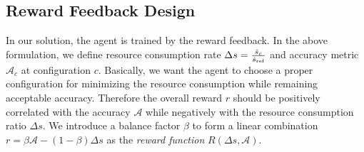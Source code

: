 \subsection{Reward Feedback Design}
\label{subsec: reward}

In our solution, the agent is trained by the reward feedback. In the above formulation, we define resource consumption rate $ \Delta s = \frac{\hat{s}_c}{\hat{s}_{\rm ref}} $ and accuracy metric $ \mathcal{A}_c $ at configuration $ c $. Basically, we want the agent to choose a proper configuration for minimizing the resource consumption while remaining acceptable accuracy. Therefore the overall reward $ r $ should be positively correlated with the accuracy $ \mathcal{A} $ while negatively with the resource consumption ratio $ \Delta s $. We introduce a balance factor $ \beta $ to form a linear combination $ r = \beta \mathcal{A} - (1-\beta) \Delta s  $ as the \emph{reward function} $ R(\Delta s, \mathcal{A}) $. %
